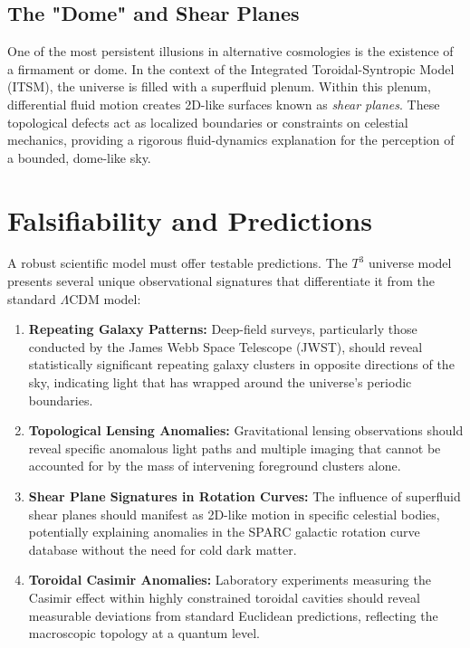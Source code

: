 \documentclass[aps,prd,11pt,onecolumn,superscriptaddress,nofootinbib,floatfix]{revtex4-2}
\begin{document}
\subsection{The "Dome" and Shear Planes}
One of the most persistent illusions in alternative cosmologies is the existence of a firmament or dome. In the context of the Integrated Toroidal-Syntropic Model (ITSM), the universe is filled with a superfluid plenum. Within this plenum, differential fluid motion creates 2D-like surfaces known as \textit{shear planes}. These topological defects act as localized boundaries or constraints on celestial mechanics, providing a rigorous fluid-dynamics explanation for the perception of a bounded, dome-like sky.

\section{Falsifiability and Predictions}
\label{sec:predictions}

A robust scientific model must offer testable predictions. The $T^3$ universe model presents several unique observational signatures that differentiate it from the standard $\Lambda$CDM model:

\begin{enumerate}
    \item \textbf{Repeating Galaxy Patterns:} Deep-field surveys, particularly those conducted by the James Webb Space Telescope (JWST), should reveal statistically significant repeating galaxy clusters in opposite directions of the sky, indicating light that has wrapped around the universe's periodic boundaries.
    \item \textbf{Topological Lensing Anomalies:} Gravitational lensing observations should reveal specific anomalous light paths and multiple imaging that cannot be accounted for by the mass of intervening foreground clusters alone.
    \item \textbf{Shear Plane Signatures in Rotation Curves:} The influence of superfluid shear planes should manifest as 2D-like motion in specific celestial bodies, potentially explaining anomalies in the SPARC galactic rotation curve database without the need for cold dark matter.
    \item \textbf{Toroidal Casimir Anomalies:} Laboratory experiments measuring the Casimir effect within highly constrained toroidal cavities should reveal measurable deviations from standard Euclidean predictions, reflecting the macroscopic topology at a quantum level.
\end{enumerate}
\end{document}
